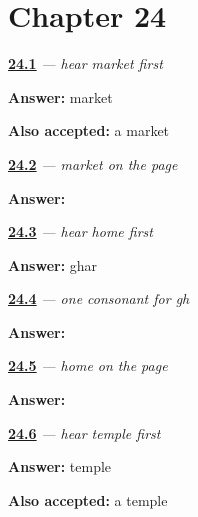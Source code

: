 \section*{Chapter 24}

\noindent\begin{minipage}[t]{\linewidth}
\raggedright
\hyperlink{review-GU-C20-hear-bajar-recall}{\textbf{24.1}} \emph{ — hear market first}\par
\small \textbf{Answer:} market\par
\footnotesize \textbf{Also accepted:} a market
\end{minipage}\par\medskip

\noindent\begin{minipage}[t]{\linewidth}
\raggedright
\hyperlink{review-GU-C20-bajar-copy}{\textbf{24.2}} \emph{ — market on the page}\par
\small \textbf{Answer:} \par
\end{minipage}\par\medskip

\noindent\begin{minipage}[t]{\linewidth}
\raggedright
\hyperlink{review-GU-C20-hear-ghar-recall}{\textbf{24.3}} \emph{ — hear home first}\par
\small \textbf{Answer:} ghar\par
\end{minipage}\par\medskip

\noindent\begin{minipage}[t]{\linewidth}
\raggedright
\hyperlink{review-GU-W20-gha-copy}{\textbf{24.4}} \emph{ — one consonant for gh}\par
\small \textbf{Answer:} \par
\end{minipage}\par\medskip

\noindent\begin{minipage}[t]{\linewidth}
\raggedright
\hyperlink{review-GU-C20-ghar-write}{\textbf{24.5}} \emph{ — home on the page}\par
\small \textbf{Answer:} \par
\end{minipage}\par\medskip

\noindent\begin{minipage}[t]{\linewidth}
\raggedright
\hyperlink{review-GU-C20-hear-mandir-recall}{\textbf{24.6}} \emph{ — hear temple first}\par
\small \textbf{Answer:} temple\par
\footnotesize \textbf{Also accepted:} a temple
\end{minipage}\par\medskip

